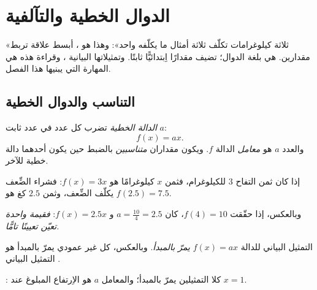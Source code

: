 \chapter{الدوال الخطية والتآلفية}\label{ch:g9:linfunc}

«ثلاثة كيلوغرامات تكلّف ثلاثة أمثال ما يكلّفه واحد»: وهذا هو
، أبسط علاقة تربط مقدارين.  هي
 بلغة الدوال؛  تضيف مقدارًا
اِبتدائيًّا ثابتًا. وتمثيلاتها البيانية ، وقراءة هذه
 هي المهارة التي يبنيها هذا الفصل.

\section{التناسب والدوال الخطية}

\begin{definition}\label{def:g9:linfunc:linear}
\emph{الدالة الخطية} تضرب كل عدد في عدد ثابت
$a$:
\[
f(x) = a x .
\]
والعدد $a$ هو \emph{معامل} الدالة $f$. ويكون مقداران
\emph{متناسبين} بالضبط حين يكون أحدهما دالة خطية
للآخر.
\end{definition}

\begin{example}\label{ex:g9:linfunc:linear}
إذا كان ثمن التفاح $3$ للكيلوغرام، فثمن $x$ كيلوغرامًا هو
$f(x) = 3x$: فشراء الضِّعف يكلّف الضِّعف، وثمن $2.5$ كغ هو
$f(2.5) = 7.5$.

وبالعكس، إذا حقّقت  $f(4) = 10$، كان
$a = \frac{10}{4} = 2.5$ و $f(x) = 2.5x$: \emph{فقيمة واحدة تعيّن
 تعيينًا تامًّا.}
\end{example}

\begin{proposition}\label{prop:g9:linfunc:lineargraph}
التمثيل البياني للدالة $f(x) = ax$  \emph{يمرّ بالمبدأ}.
وبالعكس، كل  غير عمودي يمرّ بالمبدأ هو التمثيل البياني
.
\end{proposition}
\admitted

\begin{omfigure}

{\small {}: كلا التمثيلين يمرّ بالمبدأ؛ والمعامل
$a$ هو الاِرتفاع المبلوغ عند $x = 1$.}
\end{omfigure}

